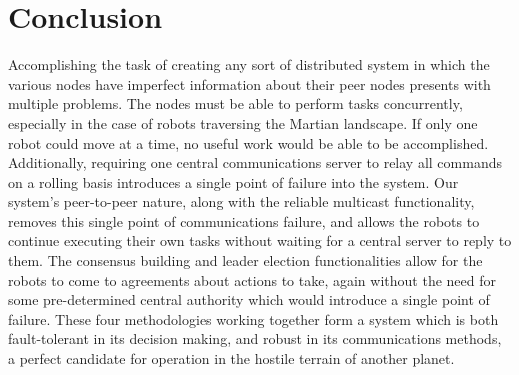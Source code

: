 \documentclass[10pt,letterpaper]{article}
\begin{document}
\section{Conclusion}
    Accomplishing the task of creating any sort of distributed system in which the various nodes have imperfect information about their peer nodes presents with multiple problems. The nodes must be able to perform tasks concurrently, especially in the case of robots traversing the Martian landscape. If only one robot could move at a time, no useful work would be able to be accomplished. Additionally, requiring one central communications server to relay all commands on a rolling basis introduces a single point of failure into the system. Our system's peer-to-peer nature, along with the reliable multicast functionality, removes this single point of communications failure, and allows the robots to continue executing their own tasks without waiting for a central server to reply to them. The consensus building and leader election functionalities allow for the robots to come to agreements about actions to take, again without the need for some pre-determined central authority which would introduce a single point of failure. These four methodologies working together form a system which is both fault-tolerant in its decision making, and robust in its communications methods, a perfect candidate for operation in the hostile terrain of another planet.
{\small


}
\end{document}
